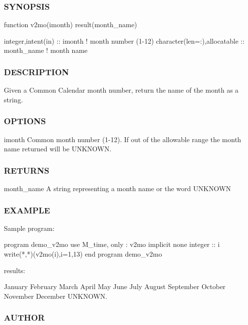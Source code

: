 \subsubsection*{S\+Y\+N\+O\+P\+S\+IS}

\begin{DoxyVerb}function v2mo(imonth) result(month_name)

 integer,intent(in)           :: imonth      ! month number (1-12)
 character(len=:),allocatable :: month_name  ! month name
\end{DoxyVerb}


\subsubsection*{D\+E\+S\+C\+R\+I\+P\+T\+I\+ON}

Given a Common Calendar month number, return the name of the month as a string.

\subsubsection*{O\+P\+T\+I\+O\+NS}

imonth Common month number (1-\/12). If out of the allowable range the month name returned will be \textquotesingle{}U\+N\+K\+N\+O\+WN\textquotesingle{}. \subsubsection*{R\+E\+T\+U\+R\+NS}

month\+\_\+name A string representing a month name or the word \textquotesingle{}U\+N\+K\+N\+O\+WN\textquotesingle{}

\subsubsection*{E\+X\+A\+M\+P\+LE}

\begin{DoxyVerb}Sample program:

 program demo_v2mo
 use M_time, only : v2mo
 implicit none
 integer :: i
    write(*,*)(v2mo(i),i=1,13)
 end program demo_v2mo

results:

 January
 February
 March
 April
 May
 June
 July
 August
 September
 October
 November
 December
 UNKNOWN.
\end{DoxyVerb}
 \subsubsection*{A\+U\+T\+H\+OR}


